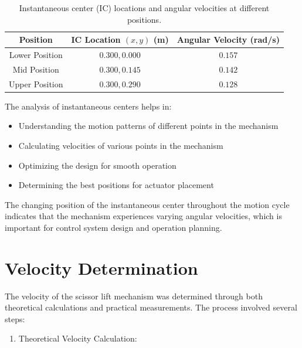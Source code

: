 \documentclass[../../main]{subfiles}
\begin{document}
\begin{table}[h!]
  \centering
  \begin{tcolorbox}[
    colback=red!5!white,colframe=red!75!black,
    title={\textbf{(IC) locations and angular velocities}},
    fonttitle=\bfseries, coltitle=white, width=0.85\linewidth]
  \begin{tabular}{|c|c|c|}
      \hline \rowcolor{red!20}
      \textbf{Position} & \textbf{IC Location $(x, y)$ (m)} & \textbf{Angular Velocity (rad/s)} \\ \hline
      Lower Position & $0.300, 0.000$ & $0.157$ \\ \hline
      Mid Position & $0.300, 0.145$ & $0.142$ \\ \hline
      Upper Position & $0.300, 0.290$ & $0.128$ \\ \hline
  \end{tabular}
\end{tcolorbox}
\caption{Instantaneous center (IC) locations and angular velocities at different positions.}
\end{table}
The analysis of instantaneous centers helps in:

\begin{itemize}
\item
  Understanding the motion patterns of different points in the mechanism
\item
  Calculating velocities of various points in the mechanism
\item
  Optimizing the design for smooth operation
\item
  Determining the best positions for actuator placement
\end{itemize}

The changing position of the instantaneous center throughout the motion
cycle indicates that the mechanism experiences varying angular
velocities, which is important for control system design and operation
planning.

\section{Velocity Determination}

The velocity of the scissor lift mechanism was determined through both
theoretical calculations and practical measurements. The process
involved several steps:

\begin{enumerate}
\def\labelenumi{\arabic{enumi}.}
\item
  Theoretical Velocity Calculation:
\end{enumerate}
\end{document}

